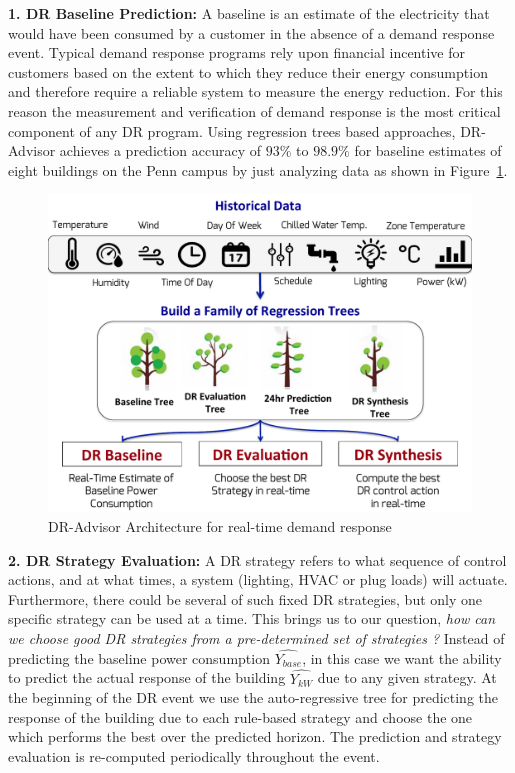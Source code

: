 \textbf{1. DR Baseline Prediction:} A baseline is an estimate of the electricity that would have been consumed by a customer in the absence of a demand response event. Typical demand response programs rely upon financial incentive for customers based on the extent to which they reduce their energy consumption and therefore require a reliable system to measure the energy reduction. For this reason the measurement and verification of demand response is the most critical component of any DR program. Using regression trees based approaches, DR-Advisor achieves a prediction accuracy of $93\%$ to $98.9\%$ for baseline estimates of eight buildings on the Penn campus by just analyzing data as shown in Figure~\ref{fig:overview}.\vspace{4pt}
\begin{figure}[t]
\centering
\includegraphics[width=0.85\columnwidth]{figs/overview.pdf}
\vspace{-3pt}
\caption{DR-Advisor Architecture for real-time demand response}
\label{fig:overview}
\vspace{-16pt}
\end{figure}

\textbf{2. DR Strategy Evaluation:} A DR strategy refers to what sequence of control actions, and at what times, a system (lighting, HVAC or plug loads) will actuate. 
Furthermore, there could be several of such fixed DR strategies, but only one specific strategy can be used at a time. 
This brings us to our question, \emph{how can we choose good DR strategies from a pre-determined set of strategies ?}
Instead of predicting the baseline power consumption $\hat{Y_{base}}$, in this case we want the ability to predict the actual response of the building $\hat{Y_{kW}}$ due to any given strategy.
 At the beginning of the DR event we use the auto-regressive tree for predicting the response of the building due to each rule-based strategy and choose the one which performs the best over the predicted horizon. The prediction and strategy evaluation is re-computed periodically throughout the event.\vspace{4pt}

